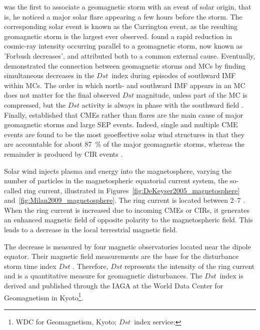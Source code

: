 \citet{Carrington1859} was the first to associate a geomagnetic storm with an event of solar origin, that is, he noticed a major solar flare appearing a few hours before the storm. The corresponding solar event is known as the Carrington event, as the resulting geomagnetic storm is the largest ever observed. \citet{Forbush1937} found a rapid reduction in cosmic-ray intensity occurring parallel to a geomagnetic storm, now known as 'Forbush decreases', and attributed both to a common external cause. Eventually, \citet{Wilson1987} demonstrated the connection between geomagnetic storms and MCs by finding simultaneous decreases in the $Dst$~index during episodes of southward IMF within MCs. The order in which north- and southward IMF appears in an MC does not matter for the final observed $Dst$ magnitude, unless part of the MC is compressed, but the $Dst$ activity is always in phase with the southward field \citep{Zhang1988}. Finally, \citet{Gosling1993} established that CMEs rather than flares are the main cause of major geomagnetic storms and large SEP events. Indeed, single and multiple CME events are found to be the most geoeffective solar wind structures in that they are accountable for about \SI{87}{\%} of the major geomagnetic storms, whereas the remainder is produced by CIR events \citep{Bothmer1995,Zhang2007}.

Solar wind injects plasma and energy into the magnetosphere, varying the number of particles in the magnetospheric equatorial current system, the so-called ring current, illustrated in Figures~\ref{fig:DeKeyser2005_magnetosphere} and~\ref{fig:Milan2009_magnetosphere}. The ring current is located between \SIrange{2}{7}{\RE} \citep{Gonzalez1994}. When the ring current is increased due to incoming CMEs or CIRs, it generates an enhanced magnetic field of opposite polarity to the magnetospheric field. This leads to a decrease in the local terrestrial magnetic field.

The decrease is measured by four magnetic observatories located near the dipole equator. Their magnetic field measurements are the base for the disturbance storm time index $Dst$ \citep{Sugiura1991}. Therefore, $Dst$ represents the intensity of the ring current and is a quantitative measure for geomagnetic disturbances. The $Dst$~index is derived and published through the IAGA at the World Data Center for Geomagnetism in Kyoto\footnote{WDC for Geomagnetism, Kyoto; $Dst$~index service: }.

